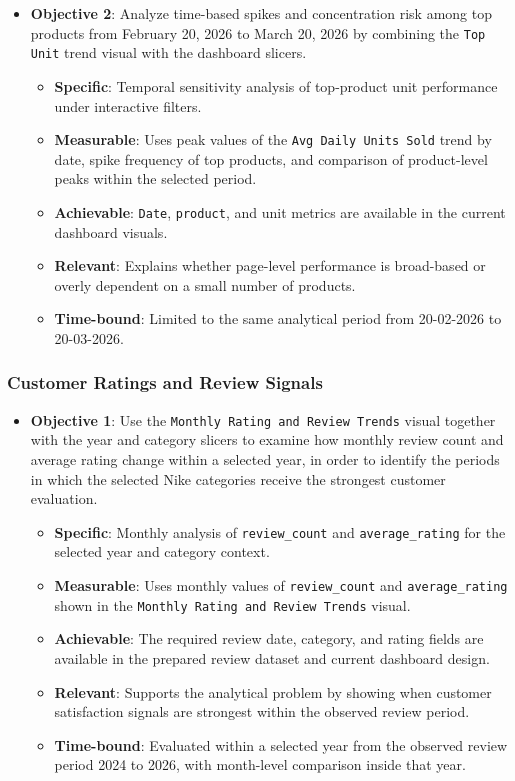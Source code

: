     \begin{itemize}
        \item \textbf{Objective 2}: Analyze time-based spikes and concentration risk among top products from February 20, 2026 to March 20, 2026 by combining the \texttt{Top Unit} trend visual with the dashboard slicers.
        \begin{itemize}
            \item \textbf{Specific}: Temporal sensitivity analysis of top-product unit performance under interactive filters.
            \item \textbf{Measurable}: Uses peak values of the \texttt{Avg Daily Units Sold} trend by date, spike frequency of top products, and comparison of product-level peaks within the selected period.
            \item \textbf{Achievable}: \texttt{Date}, \texttt{product}, and unit metrics are available in the current dashboard visuals.
            \item \textbf{Relevant}: Explains whether page-level performance is broad-based or overly dependent on a small number of products.
            \item \textbf{Time-bound}: Limited to the same analytical period from 20-02-2026 to 20-03-2026.
        \end{itemize}
    \end{itemize}

    \subsubsection{Customer Ratings and Review Signals}
    \begin{itemize}
        \item \textbf{Objective 1}: Use the \texttt{Monthly Rating and Review Trends} visual together with the year and category slicers to examine how monthly review count and average rating change within a selected year, in order to identify the periods in which the selected Nike categories receive the strongest customer evaluation.
        \begin{itemize}
            \item \textbf{Specific}: Monthly analysis of \texttt{review\_count} and \texttt{average\_rating} for the selected year and category context.
            \item \textbf{Measurable}: Uses monthly values of \texttt{review\_count} and \texttt{average\_rating} shown in the \texttt{Monthly Rating and Review Trends} visual.
            \item \textbf{Achievable}: The required review date, category, and rating fields are available in the prepared review dataset and current dashboard design.
            \item \textbf{Relevant}: Supports the analytical problem by showing when customer satisfaction signals are strongest within the observed review period.
            \item \textbf{Time-bound}: Evaluated within a selected year from the observed review period 2024 to 2026, with month-level comparison inside that year.
        \end{itemize}
    \end{itemize}

